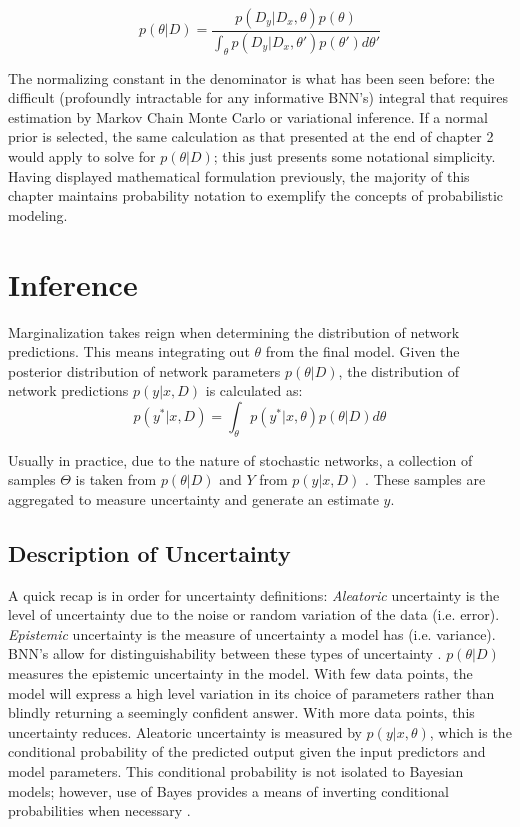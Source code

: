 $$
p(\theta|D) = \frac{p(D_{y}|D_{x},\theta)p(\theta)}{\int_\theta p(D_{y}|D_{x},\theta')p(\theta')d\theta'}
$$

The normalizing constant in the denominator is what has been seen before: the difficult (profoundly intractable for any informative BNN's) integral that requires estimation by Markov Chain Monte Carlo or variational inference.  If a normal prior is selected, the same calculation as that presented at the end of chapter 2 would apply to solve for $p(\theta|D)$; this just presents some notational simplicity.  Having displayed mathematical formulation previously, the majority of this chapter maintains probability notation to exemplify the concepts of probabilistic modeling.



\section{Inference}

Marginalization takes reign when determining the distribution of network predictions.  This means integrating out $\theta$ from the final model.  Given the posterior distribution of network parameters $p(\theta|D)$, the distribution of network predictions $p(y|x,D)$ is calculated as:
$$
p(y^*|x,D) = \int_\theta p(y^*|x,\theta)p(\theta|D)d\theta
$$

Usually in practice, due to the nature of stochastic networks, a collection of samples $\Theta$ is taken from $p(\theta|D)$ and $Y$ from $p(y|x,D)$ \cite{Jospin}. These samples are aggregated to measure uncertainty and generate an estimate $\hat{y}$.

\subsection{Description of Uncertainty}

A quick recap is in order for uncertainty definitions: \textit{Aleatoric} uncertainty is the level of uncertainty due to the noise or random variation of the data (i.e. error).  \textit{Epistemic} uncertainty is the measure of uncertainty a model has (i.e. variance).  BNN's allow for distinguishability between these types of uncertainty \cite{Jospin}.  $p(\theta|D)$ measures the epistemic uncertainty in the model.  With few data points, the model will express a high level variation in its choice of parameters rather than blindly returning a seemingly confident answer.  With more data points, this uncertainty reduces.
Aleatoric uncertainty is measured by $p(y|x,\theta)$, which is the conditional probability of the predicted output given the input predictors and model parameters.  This conditional probability is not isolated to Bayesian models; however, use of Bayes provides a means of inverting conditional probabilities when necessary \cite{Jospin}.



